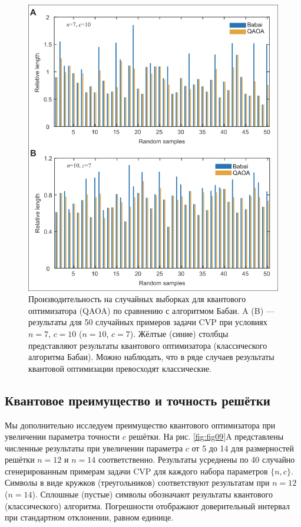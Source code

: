 \begin{figure}
    \centering
    \includegraphics[scale=0.6]{inc/fig_08.png}
    \caption{
    Производительность на случайных выборках для квантового оптимизатора (QAOA)
    по сравнению с алгоритмом Бабаи. A (B) — результаты для 50 случайных
    примеров задачи CVP при условиях $n = 7$, $c = 10$ ($n = 10$, $c = 7$).
    Жёлтые (синие) столбцы представляют результаты квантового оптимизатора
    (классического алгоритма Бабаи). Можно наблюдать, что в ряде случаев
    результаты квантовой оптимизации превосходят классические.
    }
    \label{fig:fig08}
\end{figure}

\subsection*{Квантовое преимущество и точность решётки}

Мы дополнительно исследуем преимущество квантового оптимизатора при увеличении
параметра точности $c$ решётки. На рис. \ref{fig:fig09}A представлены численные
результаты при увеличении параметра $c$ от 5 до 14 для размерностей решётки $n
= 12$ и $n = 14$ соответственно. Результаты усреднены по 40 случайно
сгенерированным примерам задачи CVP для каждого набора параметров $\{n, c\}$.
Символы в виде кружков (треугольников) соответствуют результатам при $n = 12$
($n = 14$). Сплошные (пустые) символы обозначают результаты квантового
(классического) алгоритма. Погрешности отображают доверительный интервал при
стандартном отклонении, равном единице.

